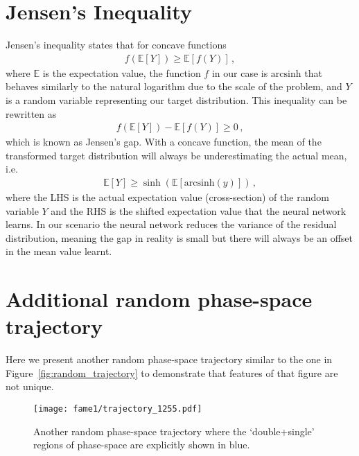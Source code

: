 \documentclass[main.tex]{subfiles}
\begin{document}
\section{Jensen's Inequality}\label{appendix:fame1_jensen}
Jensen's inequality states that for concave functions
\begin{eqnarray}
    f(\mathbb{E}[Y]) \geq \mathbb{E}[f(Y)] \, ,
\end{eqnarray}
where $\mathbb{E}$ is the expectation value, the function $f$ in our case is $\mathrm{arcsinh}$ that behaves similarly to the natural logarithm due to the scale of the problem, and $Y$ is a random variable representing our target distribution.
This inequality can be rewritten as
\begin{eqnarray}
    f(\mathbb{E}[Y]) - \mathbb{E}[f(Y)] \geq 0 \, ,
\end{eqnarray}
which is known as Jensen's gap.
With a concave function, the mean of the transformed target distribution will always be underestimating the actual mean, i.e.
\begin{eqnarray}
    \mathbb{E}[Y] \geq \sinh{(\mathbb{E}[\mathrm{arcsinh}{(y)}])} \, ,
\end{eqnarray}
where the LHS is the actual expectation value (cross-section) of the random variable $Y$ and the RHS is the shifted expectation value that the neural network learns.
In our scenario the neural network reduces the variance of the residual distribution, meaning the gap in reality is small but there will always be an offset in the mean value learnt.

\section{Additional random phase-space trajectory}\label{appendix:fame1_trajectory2}
Here we present another random phase-space trajectory similar to the one
in Figure~\ref{fig:random_trajectory} to demonstrate that features of that
figure are not unique.
\begin{figure}[ht]
    \texttt{[image: fame1/trajectory\_1255.pdf]}
    \caption{Another random phase-space trajectory where the `double+single'
    regions of phase-space are explicitly shown in blue.}
    \label{fig:trajectory_1255}
\end{figure}
\end{document}
